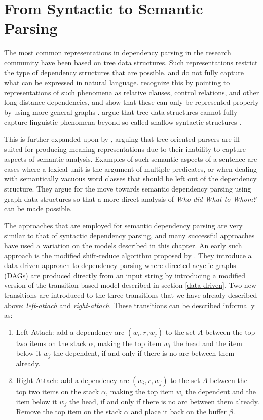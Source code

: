 \section{From Syntactic to Semantic Parsing}
\label{syntactic-semantic}

The most common representations in dependency parsing in the research community have been based on tree data structures. Such representations restrict the type of dependency structures that are possible, and do not fully capture what can be expressed in natural language. \citeauthor{Hudson:90} recognize this by pointing to representations of such phenomena as relative clauses, control relations, and other long-distance dependencies, and show that these can only be represented properly by using more general graphs \cite{Hudson:90}. \citeauthor{Sagae:Tsuji:08} argue that tree data structures cannot fully capture linguistic phenomena beyond so-called shallow syntactic structures \cite{Sagae:Tsuji:08}.

This is further expanded upon by , arguing that tree-oriented parsers are ill-suited for producing meaning representations due to their inability to capture aspects of semantic analysis. Examples of such semantic aspects of a sentence are cases where a lexical unit is the argument of multiple predicates, or when dealing with semantically vacuous word classes that should be left out of the dependency structure. They argue for the move towards semantic dependency parsing using graph data structures so that a more direct analysis of \textit{Who did What to Whom?} can be made possible.

The approaches that are employed for semantic dependency parsing are very similar to that of syntactic dependency parsing, and many successful approaches have used a variation on the models described in this chapter. An early such approach is the modified shift-reduce algorithm proposed by . They introduce a data-driven approach to dependency parsing where directed acyclic graphs (DAGs) are produced directly from an input string by introducing a modified version of the transition-based model described in section \ref{data-driven}. Two new transitions are introduced to the three transitions that we have already described above: \textit{left-attach} and \textit{right-attach}. These transitions can be described informally as:

\begin{enumerate}
\item Left-Attach: add a dependency arc $(w_i, r, w_j)$ to the set $A$ between the top two items on the stack $\alpha$, making the top item $w_i$ the head and the item below it $w_j$ the dependent, if and only if there is no arc between them already.
\item Right-Attach: add a dependency arc $(w_i, r, w_j)$ to the set $A$ between the top two items on the stack $\alpha$, making the top item $w_i$ the dependent and the item below it $w_j$ the head, if and only if there is no arc between them already. Remove the top item on the stack $\alpha$ and place it back on the buffer $\beta$.
\end{enumerate}

